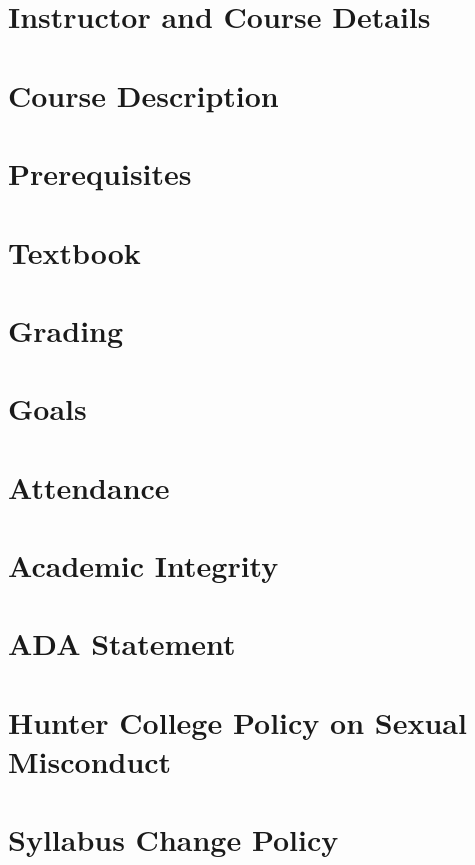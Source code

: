 \documentclass[11pt]{article} %
\title{\coursenumber\\\coursetitle}
\author{}
\date{\semester}
\begin{document}
\pagestyle{fancy} 
\fancyhead{}
\lhead{\coursenumber} %
\rhead{\semester} %

\maketitle

\thispagestyle{fancy}

\section*{Instructor and Course Details}

\section*{Course Description}

\section*{Prerequisites}

\section*{Textbook}
\section*{Grading}

\section*{Goals}

\section*{Attendance}

\section*{Academic Integrity}

\section*{ADA Statement}

\section*{Hunter College Policy on Sexual Misconduct}

\section*{Syllabus Change Policy}

\end{document}
